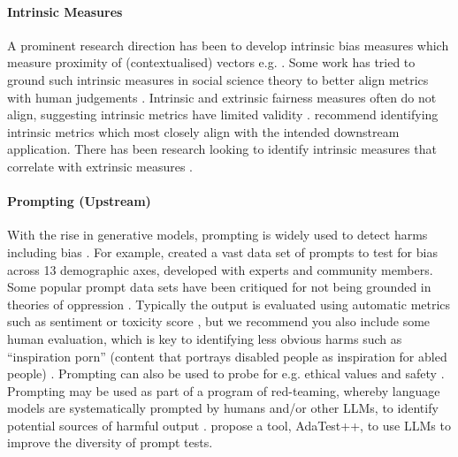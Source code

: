 \paragraph{Intrinsic Measures}
A prominent research direction has been to develop intrinsic bias measures which measure proximity of (contextualised) vectors e.g. \citet{caliskan_semantics_2017,tan_assessing_2019, may_measuring_2019}. 
Some work has tried to ground such intrinsic measures in social science theory to better align metrics with human judgements \citep{cao_theory-grounded_2022, ungless_robust_2022}. 
Intrinsic and extrinsic fairness measures often do not align, suggesting intrinsic metrics have limited validity \citep{goldfarb-tarrant_intrinsic_2021,cao_intrinsic_2022, delobelle_measuring_2022}. 
\citet{cao_intrinsic_2022} recommend identifying intrinsic metrics which most closely align with the intended downstream application. 
There has been research looking to identify intrinsic measures that correlate with extrinsic measures \citep{orgad_how_2022}.

\paragraph{Prompting (Upstream)}
With the rise in generative models, prompting is widely used to detect harms including bias \citep{goldfarb-tarrant_this_2023}.
For example, \citet{smith_im_2022} created a vast data set of prompts to test for bias across 13 demographic axes, developed with experts and community members. 
Some popular prompt data sets have been critiqued for not being grounded in theories of oppression \citep{blodgett_stereotyping_2021}. 
Typically the output is evaluated using automatic metrics such as sentiment or toxicity score \citep{goldfarb-tarrant_this_2023}, but we recommend you also include some human evaluation, which is key to identifying less obvious harms such as ``inspiration porn'' (content that portrays disabled people as inspiration for abled people) \citep{gadiraju_i_2023}. 
Prompting can also be used to probe for e.g. ethical values \citep{chun_informed_2024} and safety \citep{dinan_safetykit_2022}. Prompting may be used as part of a program of red-teaming, whereby language models are systematically prompted by humans and/or other LLMs, to identify potential sources of harmful output \citep{perez_red_2022, zhuo_red_2023, ganguli_red_2022}. \citet{rastogi_supporting_2023} propose a tool, AdaTest++, to use LLMs to improve the diversity of prompt tests. 

